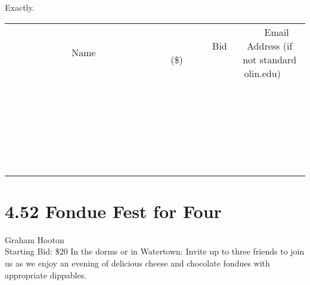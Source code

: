 \documentclass[11pt]{article}
\begin{document}
Exactly.
\\[6ex]
\begin{tabular}{c c c}
~~~~~~~~~~~~~Name~~~~~~~~~~~~~ & ~~~~~~~~~Bid (\$)~~~~~~~~~  & ~~~Email Address (if not standard olin.edu)~~~\\
 & & \\
\hline
 & & \\
\hline
 & & \\
\hline
 & & \\
\hline
 & & \\
\hline
 & & \\
\hline
 & & \\
\hline
 & & \\
\hline
 & & \\
\hline
 & & \\
\hline
 & & \\
\hline
 & & \\
\hline
 & & \\
\hline
 & & \\
\hline
 & & \\
\hline
 & & \\
\hline
 & & \\
\hline
 & & \\
\hline
 & & \\
\hline
 & & \\
\hline
 & & \\
\hline
 & & \\
\hline
 & & \\
\hline
 & & \\
\hline
 & & \\
\hline
 & & \\
\hline
\end{tabular}
\newpage
\section*{4.52 Fondue Fest for Four}
Graham Hooton
\\
Starting Bid: \$20
\newline
In the dorms or in Watertown: Invite up to three friends to join us as we enjoy an evening of delicious cheese and chocolate fondues with appropriate dippables.
\end{document}
